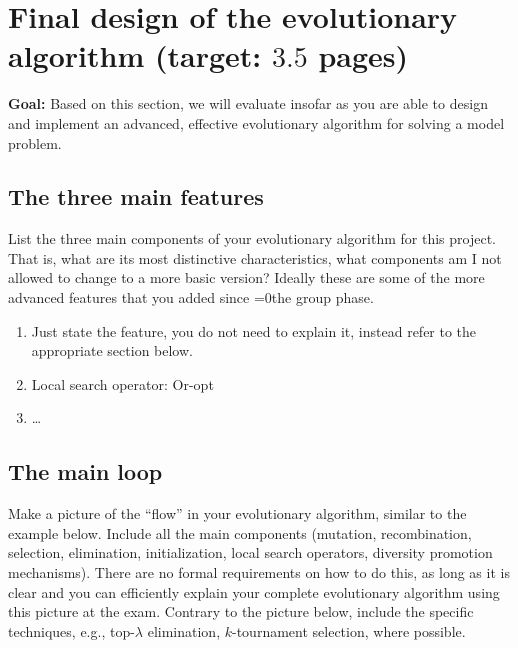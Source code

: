 \documentclass[a4paper,10pt]{article}
\def\retake{0}
\newcommand{\switch}[2]{\ifnum\retake=0{#1}\else{#2}\fi}
\newcommand{\ReplaceMe}[1]{{\color{blue}#1}}
\newcommand{\RemoveMe}[1]{{\color{purple}#1}}
\begin{document}
\section{Final design of the evolutionary algorithm \hfill(target: $3.5$ pages)} 

\RemoveMe{\textbf{Goal:} Based on this section, we will evaluate insofar as you are able to design and implement an advanced, effective evolutionary algorithm for solving a model problem.}


\subsection{The three main features}
\ReplaceMe{List the three main components of your evolutionary algorithm for this project. That is, what are its most distinctive characteristics, what components am I not allowed to change to a more basic version? Ideally these are some of the more advanced features that you added since \switch{the group phase}{your previous submission}.}

\begin{enumerate}
 \item \ReplaceMe{Just state the feature, you do not need to explain it, instead refer to the appropriate section below.}
 \item Local search operator: Or-opt
 \item \dots
\end{enumerate}

\subsection{The main loop}

\ReplaceMe{Make a picture of the ``flow'' in your evolutionary algorithm, similar to the example below. Include all the main components (mutation, recombination, selection, elimination, initialization, local search operators, diversity promotion mechanisms). There are no formal requirements on how to do this, as long as it is clear and you can efficiently explain your complete evolutionary algorithm using this picture at the exam. Contrary to the picture below, include the specific techniques, e.g., top-$\lambda$ elimination, $k$-tournament selection, where possible.}
\end{document}
